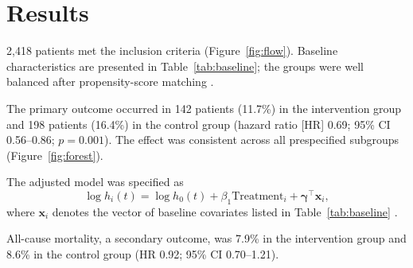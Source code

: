 \section{Results}
\label{sec:results}

2,418 patients met the inclusion criteria (Figure~\ref{fig:flow}). Baseline characteristics are presented in Table~\ref{tab:baseline}; the groups were well balanced after propensity-score matching \cite{austin2011introduction}.

The primary outcome occurred in 142 patients (11.7\%) in the intervention group and 198 patients (16.4\%) in the control group (hazard ratio [HR] 0.69; 95\% CI 0.56--0.86; $p = 0.001$). The effect was consistent across all prespecified subgroups (Figure~\ref{fig:forest}).

The adjusted model was specified as
\begin{equation}
  \log h_i(t) = \log h_0(t) + \beta_1 \text{Treatment}_i + \boldsymbol{\gamma}^\top \mathbf{x}_i ,
  \label{eq:cox}
\end{equation}
where $\mathbf{x}_i$ denotes the vector of baseline covariates listed in Table~\ref{tab:baseline} \cite{cox1972regression, therneau2000modeling}.

All-cause mortality, a secondary outcome, was 7.9\% in the intervention group and 8.6\% in the control group (HR 0.92; 95\% CI 0.70--1.21).
